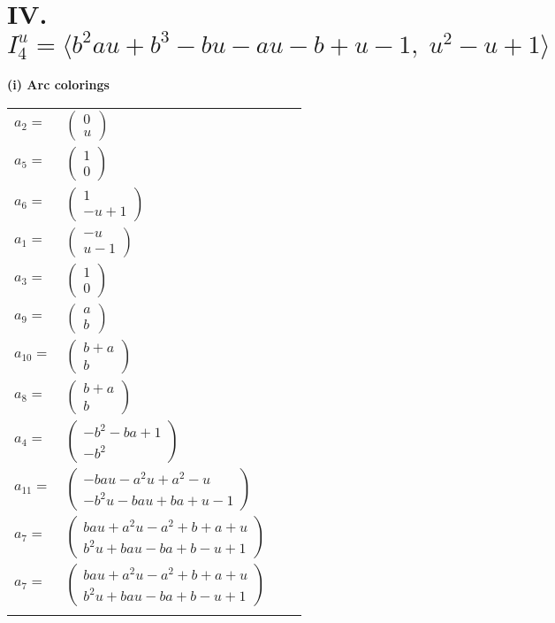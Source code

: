 \documentclass[1p]{elsarticle_modified}
\theoremstyle{definition}
\begin{document}
\centering \section*{IV. $I^u_{4}= \langle b^2 a u+b^3- b u- a u- b+u-1,\;u^2- u+1 \rangle$}
\flushleft \textbf{(i) Arc colorings}\\
\begin{tabular}{m{7pt} m{180pt} m{7pt} m{180pt} }
\flushright $a_{2}=$&$\begin{pmatrix}0\\u\end{pmatrix}$ \\
\flushright $a_{5}=$&$\begin{pmatrix}1\\0\end{pmatrix}$ \\
\flushright $a_{6}=$&$\begin{pmatrix}1\\- u+1\end{pmatrix}$ \\
\flushright $a_{1}=$&$\begin{pmatrix}- u\\u-1\end{pmatrix}$ \\
\flushright $a_{3}=$&$\begin{pmatrix}1\\0\end{pmatrix}$ \\
\flushright $a_{9}=$&$\begin{pmatrix}a\\b\end{pmatrix}$ \\
\flushright $a_{10}=$&$\begin{pmatrix}b+a\\b\end{pmatrix}$ \\
\flushright $a_{8}=$&$\begin{pmatrix}b+a\\b\end{pmatrix}$ \\
\flushright $a_{4}=$&$\begin{pmatrix}- b^2- b a+1\\- b^2\end{pmatrix}$ \\
\flushright $a_{11}=$&$\begin{pmatrix}- b a u- a^2 u+a^2- u\\- b^2 u- b a u+b a+u-1\end{pmatrix}$ \\
\flushright $a_{7}=$&$\begin{pmatrix}b a u+a^2 u- a^2+b+a+u\\b^2 u+b a u- b a+b- u+1\end{pmatrix}$\\ \flushright $a_{7}=$&$\begin{pmatrix}b a u+a^2 u- a^2+b+a+u\\b^2 u+b a u- b a+b- u+1\end{pmatrix}$\\&\end{tabular}
\end{document}
